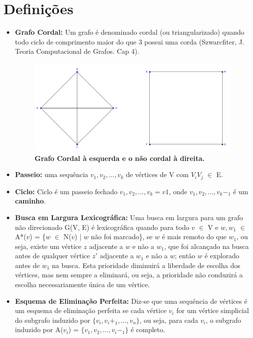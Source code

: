 \documentclass[a4paper, 11pt]{article}
\begin{document}
	\section{Definições}
		\begin{itemize}
			
			\item \textbf{Grafo Cordal:} Um grafo é denominado cordal (ou triangularizado) quando todo ciclo de comprimento maior do que 3 possui uma corda (Szwarcfiter, J. Teoria Computacional de Grafos. Cap 4). 
			
			\begin{figure}[H]
				\centering
					\includegraphics[scale=0.25]{dale.png}
				\caption{\textbf{Grafo Cordal à esquerda e o não cordal à direita.}}
			\end{figure}
			
			\item \textbf{Passeio:} uma sequência $v_1,v_2,...,v_k$ de vértices de V com $V_iV_j$ $\in$ E.
			
			\item \textbf{Ciclo:} Ciclo é um passeio fechado $v_1,v_2,...,v_k = v1$, onde $v_1,v_2,...,v_k-_1$ é um \textbf{caminho}.
			
			\item \textbf{Busca em Largura Lexicográfica:} Uma busca em largura para um grafo não direcionado G(V, E) é lexicográfica quando para todo $v$ $\in$ V e $w, w_1$ $\in$ A*($v$) = \{$w$ $\in$ N($v$) $\vert$ $w$ não foi marcado\}, se $w$ é mais remoto do que $w_1$, ou seja, existe um vértice $z$ adjacente a $w$ e não a $w_1$, que foi alcançado na busca antes de qualquer vértice $z'$ adjacente a $w_1$ e não a $w$; então $w$ é explorado antes de $w_1$ na busca. Esta prioridade diminuirá a liberdade de escolha dos vértices, mas nem sempre a eliminará, ou seja, a prioridade não conduzirá a escolha necessariamente única de um vértice.  
			
			\item \textbf{Esquema de Eliminação Perfeita:} Diz-se que uma sequência de vértices é um esquema de eliminação perfeita se cada vértice $v_i$ for um vértice simplicial do subgrafo induzido por $\{v_i, v_i+_1, …, v_n\} $, ou seja, para cada $v_i$, o subgrafo induzido por A($v_i$) = $\{v_1, v_2, …, v_i-_1\}$ é completo.
			

\end{itemize}
\end{document}
